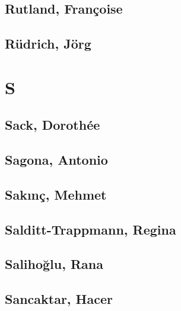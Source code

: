 \subsection[Rutland, Françoise (1)]{Rutland, Françoise}

\subsection[Rüdrich, Jörg (1)]{Rüdrich, Jörg}

\section{S}

\subsection[Sack, Dorothée (1)]{Sack, Dorothée}

\subsection[Sagona, Antonio (1)]{Sagona, Antonio}

\subsection[Sakınç, Mehmet (1)]{Sakınç, Mehmet}

\subsection[Salditt-Trappmann, Regina (1)]{Salditt-Trappmann, Regina}

\subsection[Salihoğlu, Rana (1)]{Salihoğlu, Rana}

\subsection[Sancaktar, Hacer (1)]{Sancaktar, Hacer}


